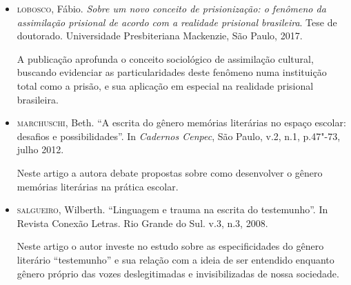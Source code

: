 \documentclass[11pt]{extarticle}
\begin{document}
\begin{itemize}
\item\textsc{lobosco}, Fábio. \textit{Sobre um novo conceito de prisionização: o fenômeno da
assimilação prisional de acordo com a realidade prisional brasileira}.
Tese de doutorado. Universidade Presbiteriana Mackenzie, São Paulo,
2017. 

A publicação aprofunda o conceito sociológico de assimilação
cultural, buscando evidenciar as particularidades deste fenômeno numa
instituição total como a prisão, e sua aplicação em especial na
realidade prisional brasileira.

\item\textsc{marchuschi}, Beth. ``A escrita do gênero memórias literárias no espaço
escolar: desafios e possibilidades''. In \emph{Cadernos Cenpec}, São Paulo, v.2,
n.1, p.47"-73, julho 2012. 

Neste artigo a autora debate propostas sobre
como desenvolver o gênero memórias literárias na prática escolar.







\item\textsc{salgueiro}, Wilberth. 	``Linguagem e trauma na escrita do testemunho''. In
Revista Conexão Letras. Rio Grande do Sul. v.3, n.3, 2008. 

Neste artigo o autor investe no estudo sobre as especificidades do gênero
literário ``testemunho'' e sua relação com a ideia de ser entendido
enquanto gênero próprio das vozes deslegitimadas e invisibilizadas de
nossa sociedade.


\end{itemize}
\end{document}
